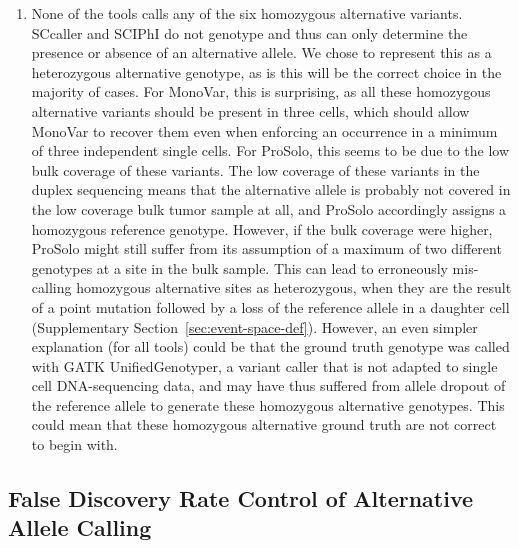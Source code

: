 \documentclass[authoryear,preprint,11pt]{scrartcl}
\begin{document}
\begin{enumerate}
  \item None of the tools calls any of the six homozygous alternative variants.
  SCcaller and SCIPhI do not genotype and thus can only determine the presence or absence of an alternative allele.
  We chose to represent this as a heterozygous alternative genotype, as is this will be the correct choice in the majority of cases.
  For MonoVar, this is surprising, as all these homozygous alternative variants should be present in three cells, which should allow MonoVar to recover them even when enforcing an occurrence in a minimum of three independent single cells.
  For ProSolo, this seems to be due to the low bulk coverage of these variants.
  The low coverage of these variants in the duplex sequencing means that the alternative allele is probably not covered in the low coverage bulk tumor sample at all, and ProSolo accordingly assigns a homozygous reference genotype.
  However, if the bulk coverage were higher, ProSolo might still suffer from its assumption of a maximum of two different genotypes at a site in the bulk sample.
  This can lead to erroneously mis-calling homozygous alternative sites as heterozygous, when they are the result of a point mutation followed by a loss of the reference allele in a daughter cell (Supplementary Section~\ref{sec:event-space-def}).
  However, an even simpler explanation (for all tools) could be that the ground truth genotype was called with GATK UnifiedGenotyper, a variant caller that is not adapted to single cell DNA-sequencing data, and may have thus suffered from allele dropout of the reference allele to generate these homozygous alternative genotypes.
  This could mean that these homozygous alternative ground truth are not correct to begin with.
\end{enumerate}

\subsection{False Discovery Rate Control of Alternative Allele Calling} \label{sec:fdr-of-alt-calling}
\end{document}
